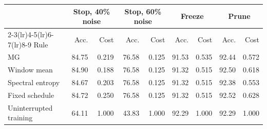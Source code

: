 \begin{tabular}{@{}l*{4}{rr}@{}}
\toprule
 & \multicolumn{2}{c}{Stop, 40\% noise} & \multicolumn{2}{c}{Stop, 60\% noise} & \multicolumn{2}{c}{Freeze} & \multicolumn{2}{c}{Prune} \\
\cmidrule(lr){2-3}\cmidrule(lr){4-5}\cmidrule(lr){6-7}\cmidrule(lr){8-9}
Rule & Acc. & Cost & Acc. & Cost & Acc. & Cost & Acc. & Cost \\
\midrule
MG & 84.75 & 0.219 & 76.58 & 0.125 & 91.53 & 0.535 & 92.44 & 0.572 \\
Window mean & 84.90 & 0.188 & 76.58 & 0.125 & 91.32 & 0.515 & 92.50 & 0.618 \\
Spectral entropy & 84.67 & 0.203 & 76.58 & 0.125 & 91.32 & 0.515 & 92.38 & 0.553 \\
Fixed schedule & 84.72 & 0.250 & 76.58 & 0.125 & 91.32 & 0.515 & 92.52 & 0.628 \\
Uninterrupted training & 64.11 & 1.000 & 43.83 & 1.000 & 92.29 & 1.000 & 92.29 & 1.000 \\
\bottomrule
\end{tabular}
